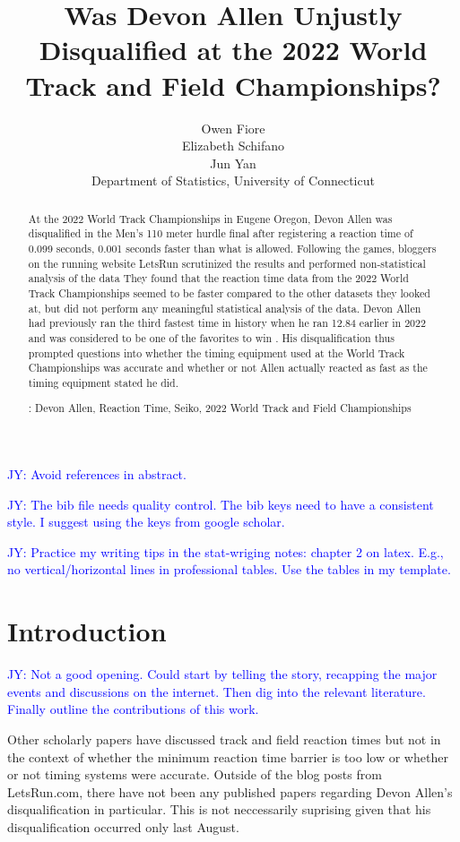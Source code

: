 \documentclass[12pt, letterpaper, titlepage]{article}
\title{Was Devon Allen Unjustly Disqualified at the 2022 World Track and Field Championships?}
\author{Owen Fiore\\
  Elizabeth Schifano\\
  Jun Yan\\[1ex]
  Department of Statistics, University of Connecticut\\
}
\date{}
\newcommand{\jy}[1]{\textcolor{blue}{JY: #1}}
\begin{document}
\maketitle

\doublespace

\begin{abstract}
  At the 2022 World Track Championships in Eugene Oregon, Devon Allen was disqualified in the
  Men's 110 meter hurdle final after registering a reaction time of 0.099 seconds, 0.001 
  seconds faster than what is allowed.  Following the games, bloggers on the running website 
  LetsRun scrutinized the results and performed non-statistical analysis of the data \citep{Johnson}
  They found that the reaction time data from the 2022 World Track Championships seemed to be faster 
  compared to the other datasets they looked at, but did not perform any meaningful statistical 
  analysis of the data.  Devon Allen had previously ran the third fastest time in history when 
  he ran 12.84 earlier in 2022 and was considered to be one of the favorites to win \citep{Preview}.  His 
  disqualification thus prompted questions into whether the timing equipment used at the World
  Track Championships was accurate and whether or not Allen actually reacted as fast as the 
  timing equipment stated he did.

\noindent{}:
Devon Allen, Reaction Time, Seiko, 2022 World Track and Field Championships 

\end{abstract}


\jy{Avoid references in abstract.}

\jy{The bib file needs quality control. The bib keys need to have a consistent
  style. I suggest using the keys from google scholar.}

\jy{Practice my writing tips in the stat-wriging notes: chapter 2 on
  latex. E.g., no vertical/horizontal lines in professional tables. Use the
  tables in my template.}

\section{Introduction}
\label{sec:intro}


\jy{Not a good opening. Could start by telling the story, recapping the major
  events and discussions on the internet. Then dig into the relevant
  literature. Finally outline the contributions of this work.
}

Other scholarly papers have discussed track and field reaction times but not in the
context of whether the minimum reaction time barrier is too low or whether or not timing
systems were accurate.  Outside of the blog posts from LetsRun.com, there have not been
any published papers regarding Devon Allen's disqualification in particular.  This is not
neccessarily suprising given that his disqualification occurred only last August.
\end{document}
